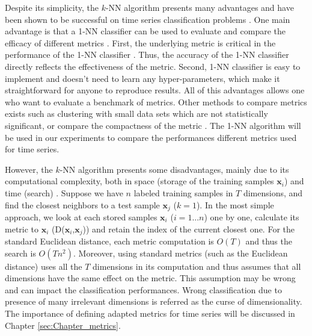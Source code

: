 Despite its simplicity, the $k$-NN algorithm presents many advantages and have been shown to be successful on time series classification problems \cite{Belongie2002,Xi2006a,Ding2008}. One main advantage is that a 1-NN classifier can be used to evaluate and compare the efficacy of different metrics \cite{Ding2008}. First, the underlying metric is critical in the performance of the 1-NN classifier \cite{Tan2005b}. Thus, the accuracy of the 1-NN classifier directly reflects the effectiveness of the metric. Second, 1-NN classifier is easy to implement and doesn't need to learn any hyper-parameters, which make it straightforward for anyone to reproduce results. All of this advantages allows one who want to evaluate a benchmark of metrics. Other methods to compare metrics exists such as clustering with small data sets which are not statistically significant, or compare the compactness of the metric \cite{Morse2007,Vlachos2006}. The 1-NN algorithm will be used in our experiments to compare the performances different metrics used for time series.

However, the $k$-NN algorithm presents some disadvantages, mainly due to its computational complexity, both in space (storage of the training samples $\textbf{x}_i$) and time (search) \cite{Duda1973}. Suppose we have $n$ labeled training samples in $T$ dimensions, and find the closest neighbors to a test sample $\textbf{x}_j$ ($k = 1$). In the most simple approach, we look at each stored samples $\textbf{x}_i$ ($i=1...n$) one by one, calculate its metric to $\textbf{x}_i$ (D($\textbf{x}_i$,$\textbf{x}_j$)) and retain the index of the current closest one. For the standard Euclidean distance, each metric computation is $O(T)$ and thus the search is $O(Tn^2)$. Moreover, using standard metrics (such as the Euclidean distance) uses all the $T$ dimensions in its computation and thus assumes that all dimensions have the same effect on the metric. This assumption may be wrong and can impact the classification performances. Wrong classification due to presence of many irrelevant dimensions is referred as the curse of dimensionality. The importance of defining adapted metrics for time series will be discussed in Chapter \ref{sec:Chapter_metrics}.


